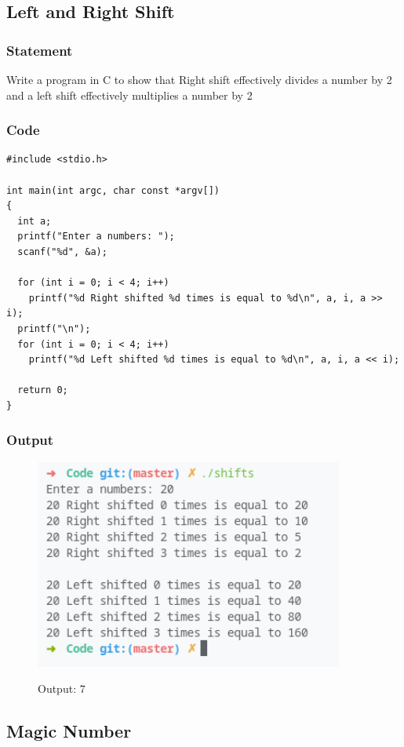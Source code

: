 \pagebreak
\subsection{Left and Right Shift}

\subsubsection{Statement}
Write a program in C to show that Right shift effectively divides a number by 2 and a left shift
effectively multiplies a number by 2

\subsubsection{Code}
\begin{verbatim} 
#include <stdio.h>

int main(int argc, char const *argv[])
{
  int a;
  printf("Enter a numbers: ");
  scanf("%d", &a);

  for (int i = 0; i < 4; i++)
    printf("%d Right shifted %d times is equal to %d\n", a, i, a >> i);
  printf("\n");
  for (int i = 0; i < 4; i++)
    printf("%d Left shifted %d times is equal to %d\n", a, i, a << i);

  return 0;
}

\end{verbatim}
\subsubsection{Output}
\begin{figure}[!htb]
  \centering
  \includegraphics[width=4in]{Images/shifts.png}
  \label{output:7}
  \caption{Output: 7}
\end{figure}


\pagebreak
\subsection{Magic Number}


